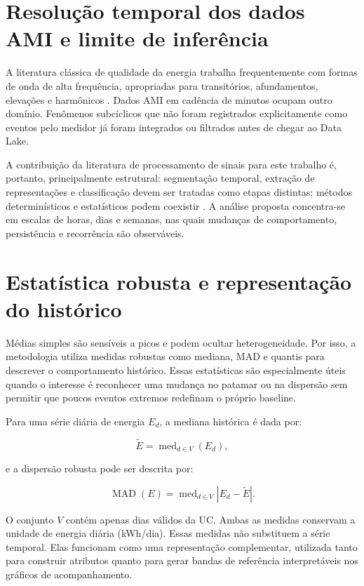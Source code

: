\section{Resolução temporal dos dados AMI e limite de inferência}\label{resoluuxe7uxe3o-temporal-dos-dados-ami-e-limite-de-inferuxeancia}

A literatura clássica de qualidade da energia trabalha frequentemente com formas de onda de alta frequência, apropriadas para transitórios, afundamentos, elevações e harmônicos \autocite{bollen2006}. Dados AMI em cadência de minutos ocupam outro domínio. Fenômenos subcíclicos que não foram registrados explicitamente como eventos pelo medidor já foram integrados ou filtrados antes de chegar ao Data Lake.

A contribuição da literatura de processamento de sinais para este trabalho é, portanto, principalmente estrutural: segmentação temporal, extração de representações e classificação devem ser tratadas como etapas distintas; métodos determinísticos e estatísticos podem coexistir \autocite{bollen2007}. A análise proposta concentra-se em escalas de horas, dias e semanas, nas quais mudanças de comportamento, persistência e recorrência são observáveis.

\section{Estatística robusta e representação do histórico}\label{estatuxedstica-robusta-e-representauxe7uxe3o-do-histuxf3rico}

Médias simples são sensíveis a picos e podem ocultar heterogeneidade. Por isso, a metodologia utiliza medidas robustas como mediana, MAD e quantis para descrever o comportamento histórico. Essas estatísticas são especialmente úteis quando o interesse é reconhecer uma mudança no patamar ou na dispersão sem permitir que poucos eventos extremos redefinam o próprio baseline.

Para uma série diária de energia \(E_d\), a mediana histórica é dada por:

\[\widetilde E=\operatorname{med}_{d\in V}(E_d),\]

e a dispersão robusta pode ser descrita por:

\[\operatorname{MAD}(E)=\operatorname{med}_{d\in V}|E_d-\widetilde E|.\]

O conjunto $V$ contém apenas dias válidos da UC. Ambas as medidas conservam a unidade de energia diária (kWh/dia). Essas medidas não substituem a série temporal. Elas funcionam como uma representação complementar, utilizada tanto para construir atributos quanto para gerar bandas de referência interpretáveis nos gráficos de acompanhamento.

